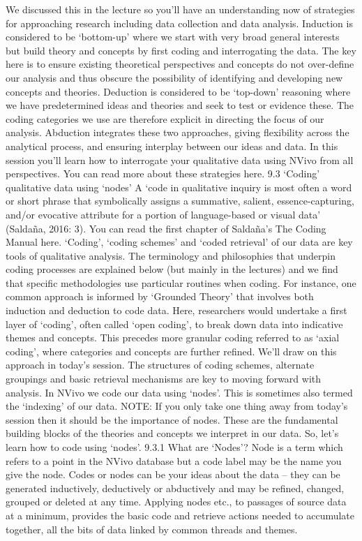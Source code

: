 \documentclass[
]{book}
\begin{document}
We discussed this in the lecture so you'll have an understanding now of strategies for approaching research including data collection and data analysis.
Induction is considered to be `bottom-up' where we start with very broad general interests but build theory and concepts by first coding and interrogating the data. The key here is to ensure existing theoretical perspectives and concepts do not over-define our analysis and thus obscure the possibility of identifying and developing new concepts and theories.
Deduction is considered to be `top-down' reasoning where we have predetermined ideas and theories and seek to test or evidence these. The coding categories we use are therefore explicit in directing the focus of our analysis.
Abduction integrates these two approaches, giving flexibility across the analytical process, and ensuring interplay between our ideas and data.
In this session you'll learn how to interrogate your qualitative data using NVivo from all perspectives. You can read more about these strategies here.
9.3 `Coding' qualitative data using `nodes'
A `code in qualitative inquiry is most often a word or short phrase that symbolically assigns a summative, salient, essence-capturing, and/or evocative attribute for a portion of language-based or visual data' (Saldaña, 2016: 3). You can read the first chapter of Saldaña's The Coding Manual here.
`Coding', `coding schemes' and `coded retrieval' of our data are key tools of qualitative analysis. The terminology and philosophies that underpin coding processes are explained below (but mainly in the lectures) and we find that specific methodologies use particular routines when coding. For instance, one common approach is informed by `Grounded Theory' that involves both induction and deduction to code data. Here, researchers would undertake a first layer of `coding', often called `open coding', to break down data into indicative themes and concepts. This precedes more granular coding referred to as `axial coding', where categories and concepts are further refined. We'll draw on this approach in today's session. The structures of coding schemes, alternate groupings and basic retrieval mechanisms are key to moving forward with analysis.
In NVivo we code our data using `nodes'. This is sometimes also termed the `indexing' of our data.
NOTE: If you only take one thing away from today's session then it should be the importance of nodes. These are the fundamental building blocks of the theories and concepts we interpret in our data.
So, let's learn how to code using `nodes'.
9.3.1 What are `Nodes'?
Node is a term which refers to a point in the NVivo database but a code label may be the name you give the node. Codes or nodes can be your ideas about the data -- they can be generated inductively, deductively or abductively and may be refined, changed, grouped or deleted at any time. Applying nodes etc., to passages of source data at a minimum, provides the basic code and retrieve actions needed to accumulate together, all the bits of data linked by common threads and themes.
\end{document}
